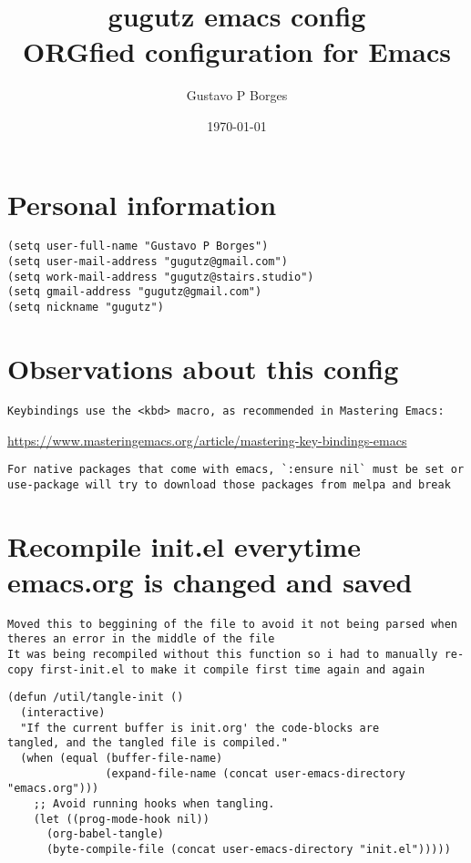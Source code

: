 \documentclass[11pt]{article}
\author{Gustavo P Borges}
\date{\today}
\title{gugutz emacs config\\\medskip
\large ORGfied configuration for Emacs}
\begin{document}
\maketitle
\setcounter{tocdepth}{0}
\tableofcontents


\section*{Personal information}
\label{sec:org76ecea5}

\begin{verbatim}
(setq user-full-name "Gustavo P Borges")
(setq user-mail-address "gugutz@gmail.com")
(setq work-mail-address "gugutz@stairs.studio")
(setq gmail-address "gugutz@gmail.com")
(setq nickname "gugutz")
\end{verbatim}

\section*{Observations about this config}
\label{sec:orgcccf9cd}
\begin{verbatim}
Keybindings use the <kbd> macro, as recommended in Mastering Emacs:
\end{verbatim}

\url{https://www.masteringemacs.org/article/mastering-key-bindings-emacs}

\begin{verbatim}
For native packages that come with emacs, `:ensure nil` must be set or use-package will try to download those packages from melpa and break
\end{verbatim}

\section*{Recompile init.el everytime emacs.org is changed and saved}
\label{sec:orgfc574e5}

\begin{verbatim}
Moved this to beggining of the file to avoid it not being parsed when theres an error in the middle of the file
It was being recompiled without this function so i had to manually re-copy first-init.el to make it compile first time again and again
\end{verbatim}



\begin{verbatim}
(defun /util/tangle-init ()
  (interactive)
  "If the current buffer is init.org' the code-blocks are
tangled, and the tangled file is compiled."
  (when (equal (buffer-file-name)
               (expand-file-name (concat user-emacs-directory "emacs.org")))
    ;; Avoid running hooks when tangling.
    (let ((prog-mode-hook nil))
      (org-babel-tangle)
      (byte-compile-file (concat user-emacs-directory "init.el")))))
\end{verbatim}
\end{document}

